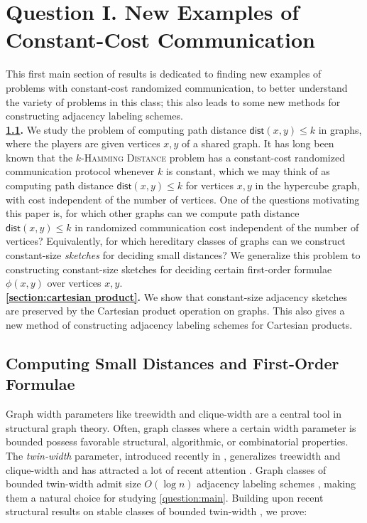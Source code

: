 \documentclass{theoretics}
\newcommand{\dist}{\mathsf{dist}}
\begin{document}
\section{Question I. New Examples of Constant-Cost Communication}
\label{sec:new_examples}

This first main section of results is dedicated to finding new examples of problems with
constant-cost randomized communication, to better understand the variety of problems in this class;
this also leads to some new methods for constructing adjacency labeling schemes.\\

\noindent
\textbf{\cref{section:twin-width}.} We study the problem of computing path distance $\dist(x,y) \leq k$
in graphs, where the players are given vertices $x,y$ of a shared graph.  It has long been known
\cite{Yao03,HSZZ06} that the \textsc{$k$-Hamming Distance} problem has a constant-cost randomized
communication protocol whenever $k$ is constant, which we may think of as computing path distance
$\dist(x,y) \leq k$ for vertices $x,y$ in the hypercube graph, with cost independent of the number
of vertices. One of the questions motivating this paper is, for which other graphs can we compute
path distance $\dist(x,y) \leq k$ in randomized communication cost independent of the number of
vertices? Equivalently, for which hereditary classes of graphs can we construct constant-size
\emph{sketches} for deciding small distances? We generalize this problem to constructing
constant-size sketches for deciding certain first-order formulae $\phi(x,y)$ over vertices $x,y$.\\

\noindent
\textbf{\cref{section:cartesian product}.} We show that constant-size adjacency sketches are
preserved by the Cartesian product operation on graphs. This also gives a new method of constructing
adjacency labeling schemes for Cartesian products.

\subsection{Computing Small Distances and First-Order Formulae}
\label{section:twin-width}

Graph width parameters like treewidth \cite{robertson1986graph} and clique-width
\cite{courcelle1993handle} are a central tool in structural graph theory. Often, graph classes where
a certain width parameter is bounded possess favorable structural, algorithmic, or combinatorial
properties.  The \emph{twin-width} parameter, introduced recently in \cite{BKTW20}, generalizes
treewidth and clique-width and has attracted a lot of recent attention
\cite{GPT21,schidler2021sat,ahn2021bounds,balaban2021twin}.  Graph classes of
bounded twin-width admit size $O(\log n)$ adjacency labeling schemes \cite{BGK+21a}, making them a
natural choice for studying \cref{question:main}. Building upon recent structural results on stable
classes of bounded twin-width \cite{GPT21}, we prove:
\end{document}
